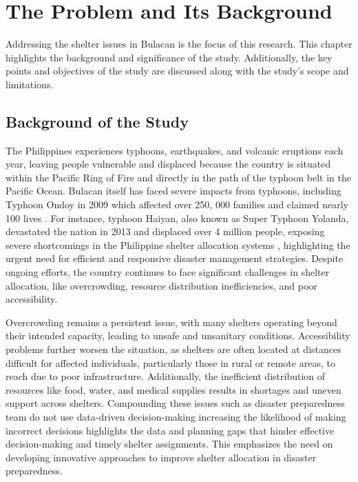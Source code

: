 \chapter{The Problem and Its Background}

	Addressing the shelter issues in Bulacan is the focus of this research. This chapter highlights the background and significance of the study. Additionally, the key points and objectives of the study are discussed along with the study's scope and limitations.

\section{Background of the Study}

	The Philippines experiences typhoons, earthquakes, and volcanic eruptions each year, leaving people vulnerable and displaced because the country is situated within the Pacific Ring of Fire and directly in the path of the typhoon belt in the Pacific Ocean. Bulacan itself has faced severe impacts from typhoons, including Typhoon Ondoy in 2009 which affected over 250, 000 families and claimed nearly 100 lives  \parencite{James2009}. For instance, typhoon Haiyan, also known as Super Typhoon Yolanda, devastated the nation in 2013 and displaced over 4 million people, exposing severe shortcomings in the Philippine shelter allocation systems \parencite{Iuchi2019}, highlighting the urgent need for efficient and responsive disaster management strategies. Despite ongoing efforts, the country continues to face significant challenges in shelter allocation, like overcrowding, resource distribution inefficiencies, and poor accessibility.
	
	Overcrowding remains a persistent issue, with many shelters operating beyond their intended capacity, leading to unsafe and unsanitary conditions. Accessibility problems further worsen the situation, as shelters are often located at distances difficult for affected individuals, particularly those in rural or remote areas, to reach due to poor infrastructure.	Additionally, the inefficient distribution of resources like food, water, and medical supplies results in shortages and uneven support across shelters. Compounding these issues such as disaster preparedness team do not use data-driven decision-making increasing the likelihood of making incorrect decisions highlights the data and planning gaps that hinder effective decision-making and timely shelter assignments. This emphasizes the need on developing innovative approaches to improve shelter allocation in disaster preparedness. 
	
